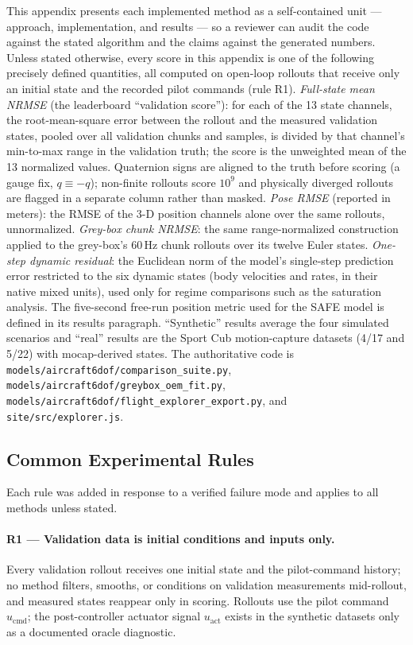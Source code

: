 \documentclass[11pt]{article}
\begin{document}
This appendix presents each implemented method as a self-contained unit ---
approach, implementation, and results --- so a reviewer can audit the code
against the stated algorithm and the claims against the generated numbers.
Unless stated otherwise, every score in this appendix is one of the
following precisely defined quantities, all computed on open-loop rollouts
that receive only an initial state and the recorded pilot commands (rule
R1). \emph{Full-state mean NRMSE} (the leaderboard ``validation score''):
for each of the 13 state channels, the root-mean-square error between the
rollout and the measured validation states, pooled over all validation
chunks and samples, is divided by that channel's min-to-max range in the
validation truth; the score is the unweighted mean of the 13 normalized
values. Quaternion signs are aligned to the truth before scoring (a gauge
fix, $q\equiv-q$); non-finite rollouts score $10^9$ and physically
diverged rollouts are flagged in a separate column rather than masked.
\emph{Pose RMSE} (reported in meters): the RMSE of the 3-D position
channels alone over the same rollouts, unnormalized. \emph{Grey-box
chunk NRMSE}: the same range-normalized construction applied to the
grey-box's 60\,Hz chunk rollouts over its twelve Euler states.
\emph{One-step dynamic residual}: the Euclidean norm of the model's
single-step prediction error restricted to the six dynamic states
(body velocities and rates, in their native mixed units), used only for
regime comparisons such as the saturation analysis. The five-second
free-run position metric used for the SAFE model is defined in its results
paragraph. ``Synthetic'' results average the four simulated scenarios and
``real'' results are the Sport Cub motion-capture datasets (4/17 and 5/22)
with mocap-derived states. The authoritative code is
\texttt{models/aircraft6dof/comparison\_suite.py},
\texttt{models/aircraft6dof/greybox\_oem\_fit.py},
\texttt{models/aircraft6dof/flight\_explorer\_export.py}, and
\texttt{site/src/explorer.js}.

\subsection{Common Experimental Rules}

Each rule was added in response to a verified failure mode and applies to all
methods unless stated.

\paragraph{R1 --- Validation data is initial conditions and inputs only.}
Every validation rollout receives one initial state and the pilot-command
history; no method filters, smooths, or conditions on validation
measurements mid-rollout, and measured states reappear only in scoring.
Rollouts use the pilot command $u_{\mathrm{cmd}}$; the post-controller
actuator signal $u_{\mathrm{act}}$ exists in the synthetic datasets only as
a documented oracle diagnostic.
\end{document}
